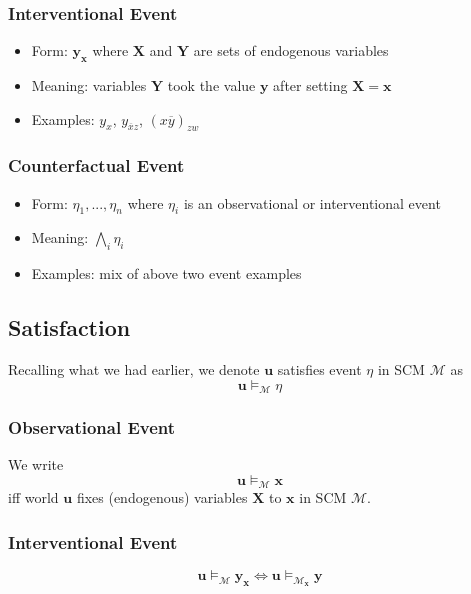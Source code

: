 \documentclass[11pt]{article}
\newcommand{\bu}{\mathbf{u}}
\newcommand{\bx}{\mathbf{x}}
\newcommand{\by}{\mathbf{y}}
\begin{document}
\subsubsection{Interventional Event}
\begin{itemize}
	\item Form: $\mathbf y _ \mathbf x$ where $\mathbf X$ and $\mathbf Y $ are sets of endogenous variables
	\item Meaning: variables $\mathbf Y$ took the value $\by$ after setting $\mathbf X = \bx$
	\item Examples: $y_x$, \quad $y_{\overbar x z}$, \quad $(x\overbar y)_{zw}$
\end{itemize}

\subsubsection{Counterfactual Event}
\begin{itemize}
	\item Form: $\eta_1, ..., \eta_n$ where $\eta_i$ is an observational or interventional event
	\item Meaning: $\bigwedge_i \eta_ i$
	\item Examples: mix of above two event examples
\end{itemize}

\subsection{Satisfaction}
Recalling what we had earlier, we denote $\bu$ satisfies event $\eta$ in SCM $\mathcal M$ as 
\begin{equation}
	\mathbf u \vDash_{\mathcal M} \eta
\end{equation}

\subsubsection{Observational Event}
We write 
\begin{equation}
	\bu \vDash_{\mathcal M} \mathbf x
\end{equation}
iff world $\bu$ fixes (endogenous) variables $\mathbf X$ to $\bx$ in SCM $\mathcal M$. 

\subsubsection{Interventional Event}
\begin{equation}
	\bu \vDash_{\mathcal M} \by_\bx \iff \bu \vDash_{\mathcal M_\bx} \by
\end{equation}
\end{document}
